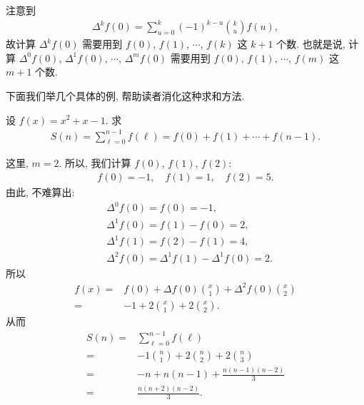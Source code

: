 注意到
\begin{align*}
    \Delta^k f(0) = \sum_{u = 0}^{k} (-1)^{k-u} \binom{k}{u} f(u),
\end{align*}
故计算 $\Delta^k f(0)$ 需要用到 $f(0)$, $f(1)$, $\cdots$, $f(k)$ 这 $k+1$ 个数. 也就是说, 计算 $\Delta^0 f(0)$, $\Delta^1 f(0)$, $\cdots$, $\Delta^m f(0)$ 需要用到 $f(0)$, $f(1)$, $\cdots$, $f(m)$ 这 $m+1$ 个数.

下面我们举几个具体的例, 帮助读者消化这种求和方法.

\begin{example}
    设 $f(x) = x^2 + x - 1$. 求
    \begin{align*}
        S(n) = \sum_{\ell = 0}^{n - 1} f(\ell) = f(0) + f(1) + \cdots + f(n - 1).
    \end{align*}

    这里, $m = 2$. 所以, 我们计算 $f(0)$, $f(1)$, $f(2)$:
    \begin{align*}
        f(0) = -1, \quad f(1) = 1, \quad f(2) = 5.
    \end{align*}
    由此, 不难算出:
    \begin{align*}
         & \Delta^0 f(0) = f(0) = -1,                         \\
         & \Delta^1 f(0) = f(1) - f(0) = 2,                   \\
         & \Delta^1 f(1) = f(2) - f(1) = 4,                   \\
         & \Delta^2 f(0) = \Delta^1 f(1) - \Delta^1 f(0) = 2.
    \end{align*}
    所以
    \begin{align*}
        f(x)
        = {} & f(0) + \Delta f(0) \binom{x}{1} + \Delta^2 f(0) \binom{x}{2} \\
        = {} & -1 + 2 \binom{x}{1} + 2 \binom{x}{2}.
    \end{align*}
    从而
    \begin{align*}
        S(n)
        = {} & \sum_{\ell = 0}^{n - 1} f(\ell)                   \\
        = {} & -1 \binom{n}{1} + 2 \binom{n}{2} + 2 \binom{n}{3} \\
        = {} & -n + n(n-1) + \frac{n(n-1)(n-2)}{3}               \\
        = {} & \frac{n(n+2)(n-2)}{3}.
    \end{align*}


\end{example}
